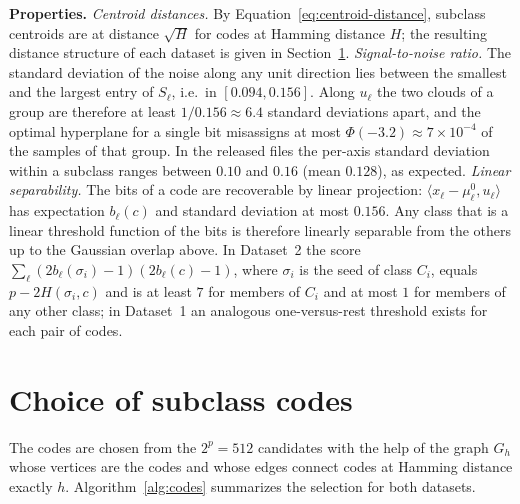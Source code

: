 \documentclass[../ppgc-tese.tex]{subfiles}
\begin{document}
\noindent\textbf{Properties.}
\emph{Centroid distances.} By Equation~\ref{eq:centroid-distance}, subclass centroids are at distance $\sqrt{H}$ for codes at Hamming distance $H$; the resulting distance structure of each dataset is given in Section~\ref{app:codes}.
\emph{Signal-to-noise ratio.} The standard deviation of the noise along any unit direction lies between the smallest and the largest entry of $S_\ell$, i.e.\ in $[0.094, 0.156]$. Along $u_\ell$ the two clouds of a group are therefore at least $1/0.156 \approx 6.4$ standard deviations apart, and the optimal hyperplane for a single bit misassigns at most $\Phi(-3.2) \approx 7 \times 10^{-4}$ of the samples of that group. In the released files the per-axis standard deviation within a subclass ranges between $0.10$ and $0.16$ (mean $0.128$), as expected.
\emph{Linear separability.} The bits of a code are recoverable by linear projection: $\langle x_\ell - \mu_\ell^0, u_\ell \rangle$ has expectation $b_\ell(c)$ and standard deviation at most $0.156$. Any class that is a linear threshold function of the bits is therefore linearly separable from the others up to the Gaussian overlap above. In Dataset~2 the score $\sum_\ell (2 b_\ell(\sigma_i) - 1)(2 b_\ell(c) - 1)$, where $\sigma_i$ is the seed of class $C_i$, equals $p - 2H(\sigma_i, c)$ and is at least $7$ for members of $C_i$ and at most $1$ for members of any other class; in Dataset~1 an analogous one-versus-rest threshold exists for each pair of codes.

\section{Choice of subclass codes}\label{app:codes}

The codes are chosen from the $2^p = 512$ candidates with the help of the graph $G_h$ whose vertices are the codes and whose edges connect codes at Hamming distance exactly $h$. Algorithm~\ref{alg:codes} summarizes the selection for both datasets.
\end{document}
